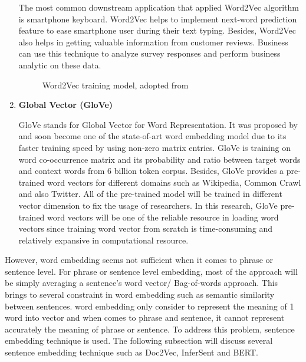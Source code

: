 \documentclass[twoside]{utmthesis}
\begin{document}
\begin{enumerate}
	The most common downstream application that applied Word2Vec algorithm is smartphone keyboard. Word2Vec helps to implement next-word prediction feature to ease smartphone user during their text typing. Besides, Word2Vec also helps in getting valuable information from customer reviews. Business can use this technique to analyze survey responses and perform business analytic on these data.  
	
	\begin{figure}[H]
		\centering
		\caption{Word2Vec training model, adopted from \cite{mikolov2013efficient}}
		\label{fig:word2vec}
	\end{figure}
	
	
	\item \textbf{Global Vector (GloVe)}
	
	GloVe stands for Global Vector for Word Representation. It was proposed by  \cite{pennington2014glove} and soon become one of the state-of-art word embedding model due to its faster training speed by using non-zero matrix entries. GloVe is training on word co-occurrence matrix and its probability and ratio between target words and context words from 6 billion token corpus. Besides, GloVe provides a pre-trained word vectors for different domains such as Wikipedia, Common Crawl and also Twitter. All of the pre-trained model will be trained in different vector dimension to fix the usage of researchers. In this research, GloVe pre-trained word vectors will be one of the reliable resource in loading word vectors since training word vector from scratch is time-consuming and relatively expansive in computational resource. 
	
\end{enumerate} 

However, word embedding seems not sufficient when it comes to phrase or sentence level. For phrase or sentence level embedding, most of the approach will be simply averaging a sentence's word vector/ Bag-of-words approach. This brings to several constraint in word embedding such as semantic similarity between sentences. word embedding only consider to represent the meaning of 1 word into vector and when comes to phrase and sentence, it cannot represent accurately the meaning of phrase or sentence. To address this problem, sentence embedding technique is used. The following subsection will discuss several sentence embedding technique such as Doc2Vec, InferSent and BERT.    
\end{document}
